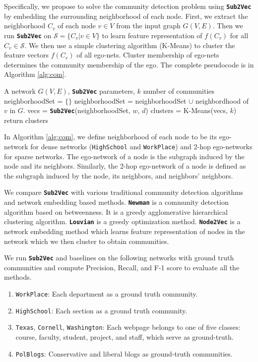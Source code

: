 \documentclass[sigconf]{acmart}
\newcommand{\alg}{{\bf {\tt Sub2Vec}}\xspace}
\newcommand{\nodevec}{{\bf {\tt Node2Vec}}\xspace}
\newcommand{\newman}{{\bf {\tt Newman}}\xspace}
\newcommand{\dlouvian}{{\bf {\tt Louvian}}\xspace}
\newcommand{\workplace}{{\tt WorkPlace}\xspace}
\newcommand{\highschool}{{\tt HighSchool}\xspace}
\newcommand{\polblogs}{{\tt PolBlogs}\xspace}
\newcommand{\texas}{{\tt Texas}\xspace}
\newcommand{\washington}{{\tt Washington}\xspace}
\newcommand{\cornell}{{\tt Cornell}\xspace}
\newcommand{\s}{\mathcal{S}}
\begin{document}
Specifically, we propose to solve the community detection problem using \alg by embedding the surrounding neighborhood of each node. First, we extract the neighborhood $C_v$ of each node $v \in V$ from the input graph $G(V,E)$. Then we run \alg on $\s = \{C_v | v \in V \}$ to learn feature representation of $f(C_v)$ for all $C_v \in \s$. We then use a simple clustering algorithm (K-Means) to cluster the feature vectors $f(C_v)$ of all ego-nets. Cluster membership of ego-nets determines the community membership of the ego.   The complete pseudocode is in Algorithm \ref{alg:com}.
  

\begin{algorithm}
\caption{Community Detection using \alg}
\label{alg:com}
\begin{algorithmic} [1]
\REQUIRE A network $G(V,E)$, \alg parameters, $k$ number of communities
\STATE neighborhoodSet = $\{ \}$ 
	\STATE neighborhoodSet = neighborhoodSet $\cup$ neighbordhood of $v$ in $G$.
\ENDFOR
\STATE vecs = \alg(neighborhoodSet, $w$, $d$)
\STATE clusters = K-Means(vecs, $k$)
\STATE return clusters
\end{algorithmic}
\end{algorithm}

In Algorithm \ref{alg:com},  we define neighborhood of each node to be its ego-network for dense networks (\highschool and \workplace) and 2-hop ego-networks for sparse networks. The ego-network of a node is the subgraph induced by the node and its neighbors.  Similarly,  the 2-hop ego-network of a node is defined as the subgraph induced by the node, its neighbors, and neighbors' neighbors. 

We compare \alg with various traditional community detection algorithms and network embedding based methods. \newman \cite{girvan2002community} is a community detection algorithm based on betweenness. It is a greedy agglomerative hierarchical clustering algorithm. \dlouvian \cite{blondel2008fast} is a greedy optimization method. \nodevec is a network embedding method which learns feature representation of nodes in the network which we then cluster to obtain communities. 


We run \alg and baselines on the following networks with ground truth communities and compute Precision, Recall, and F-1 score to evaluate all the methods. 

\begin{enumerate}[wide, labelwidth=!, labelindent=0pt, itemsep=0pt]
\item  \workplace: Each department as a ground truth community. 
 
 \item \highschool: Each section as a ground truth community. 

\item \texas, \cornell, \washington: Each webpage belongs to one of five classes: course, faculty, student, project, and staff, which serve as ground-truth.

\item \polblogs: Conservative and liberal blogs as ground-truth communities. 

\end{enumerate}
\end{document}
